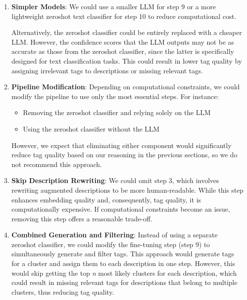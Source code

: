 \begin{enumerate}
    \item \textbf{Simpler Models}: We could use a smaller LLM for step 9 or a more lightweight zeroshot text classifier \cite{noauthor_moritzlaurerdeberta-v3-large-zeroshot-v20_2024} for step 10 to reduce computational cost. 
    
    Alternatively, the zeroshot classifier could be entirely replaced with a cheaper LLM. However, the confidence scores that the LLM outputs may not be as accurate as those from the zeroshot classifier, since the latter is specifically designed for text classification tasks. This could result in lower tag quality by assigning irrelevant tags to descriptions or missing relevant tags.
    
    \item \textbf{Pipeline Modification}: Depending on computational constraints, we could modify the pipeline to use only the most essential steps. For instance:
    \begin{itemize}
        \item Removing the zeroshot classifier and relying solely on the LLM
        \item Using the zeroshot classifier without the LLM
    \end{itemize}
    However, we expect that eliminating either component would significantly reduce tag quality based on our reasoning in the previous sections, so we do not recommend this approach.
    
    \item \textbf{Skip Description Rewriting}: We could omit step 3, which involves rewriting augmented descriptions to be more human-readable. While this step enhances embedding quality and, consequently, tag quality, it is computationally expensive. If computational constraints become an issue, removing this step offers a reasonable trade-off.
    
    \item \textbf{Combined Generation and Filtering}: Instead of using a separate zeroshot classifier, we could modify the fine-tuning step (step 9) to simultaneously generate and filter tags. This approach would generate tags for a cluster and assign them to each description in one step. However, this would skip getting the top \textit{n} most likely clusters for each description, which could result in missing relevant tags for descriptions that belong to multiple clusters, thus reducing tag quality.
\end{enumerate}

